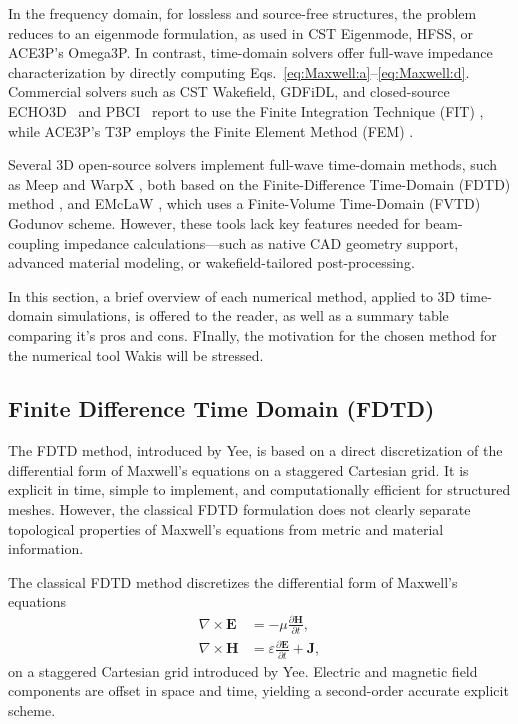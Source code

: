 In the frequency domain, for lossless and source-free structures, the problem reduces to an eigenmode formulation, as used in CST Eigenmode, HFSS, or ACE3P’s Omega3P. In contrast, time-domain solvers offer full-wave impedance characterization by directly computing Eqs.~\eqref{eq:Maxwell:a}--\eqref{eq:Maxwell:d}. Commercial solvers such as CST Wakefield, GDFiDL, and closed-source ECHO3D~\cite{zagorodnov_echo4d} and PBCI~\cite{Lau:1182975} report to use the Finite Integration Technique (FIT) \cite{weiland_finite_2003}, while ACE3P’s T3P employs the Finite Element Method (FEM) \cite{candel_ace3p_2010}.

Several 3D open-source solvers implement full-wave time-domain methods, such as Meep \cite{oskooi_meep_2010} and WarpX \cite{fedeli_pushing_2022}, both based on the Finite-Difference Time-Domain (FDTD) method \cite{yee_numerical_1966}, and EMcLaW \cite{moreno_emclaw_2021}, which uses a Finite-Volume Time-Domain (FVTD) Godunov scheme. However, these tools lack key features needed for beam-coupling impedance calculations—such as native CAD geometry support, advanced material modeling, or wakefield-tailored post-processing. 

In this section, a brief overview of each numerical method, applied to 3D time-domain simulations, is offered to the reader, as well as a summary table comparing it's pros and cons. FInally, the motivation for the chosen method for the numerical tool Wakis will be stressed. 

\subsection{Finite Difference Time Domain (FDTD)}

The FDTD method, introduced by Yee, is based on a direct discretization of the differential form of Maxwell's equations on a staggered Cartesian grid. It is explicit in time, simple to implement, and computationally efficient for structured meshes. However, the classical FDTD formulation does not clearly separate topological properties of Maxwell’s equations from metric and material information.

The classical FDTD method discretizes the differential form of Maxwell's equations
\begin{align}
\nabla \times \mathbf{E} &= -\mu \frac{\partial \mathbf{H}}{\partial t}, \\
\nabla \times \mathbf{H} &= \varepsilon \frac{\partial \mathbf{E}}{\partial t} + \mathbf{J},
\end{align}
on a staggered Cartesian grid introduced by Yee. Electric and magnetic field components are offset in space and time, yielding a second-order accurate explicit scheme.

